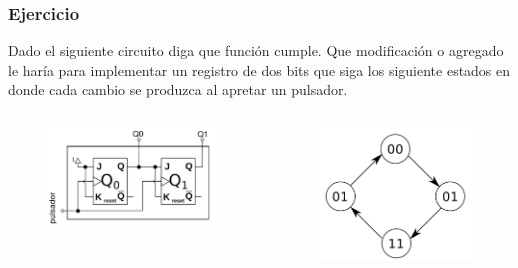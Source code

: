 \documentclass[10pt]{beamer}
\begin{document}
\begin{frame}
\frametitle{Ejercicio}

Dado el siguiente circuito diga que función cumple.
Que modificación o agregado le haría para implementar un registro de dos bits
que siga los siguiente estados en donde cada cambio se produzca al apretar un pulsador.

\begin{columns}
        \begin{figure}[h!]
            \centering
          \includegraphics[scale=0.21]{circuito.png}
        \end{figure}
        \begin{figure}[h!]
          \centering
            \includegraphics[scale=0.21]{ej1.png}
      \end{figure}
\end{columns}

\end{frame}
\end{document}
